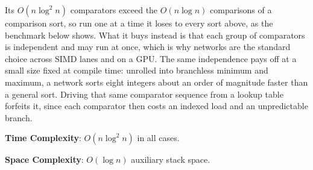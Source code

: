 Its $O(n \log^{2} n)$ comparators exceed the $O(n \log n)$ comparisons of a comparison sort, so run one at a time it loses to every sort above, as the benchmark below shows. What it buys instead is that each group of comparators is independent and may run at once, which is why networks are the standard choice across SIMD lanes and on a GPU. The same independence pays off at a small size fixed at compile time: unrolled into branchless minimum and maximum, a network sorts eight integers about an order of magnitude faster than a general sort. Driving that same comparator sequence from a lookup table forfeits it, since each comparator then costs an indexed load and an unpredictable branch.

\textbf{Time Complexity}: $O(n \log^{2} n)$ in all cases.

\textbf{Space Complexity}: $O(\log n)$ auxiliary stack space.

